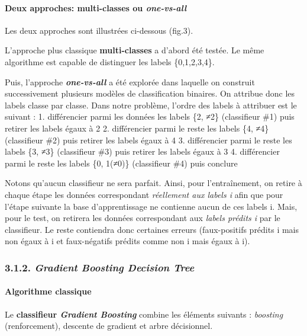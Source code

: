 \documentclass[11pt]{article}
\begin{document}
\paragraph{\texorpdfstring{Deux approches: multi-classes ou
\emph{one-vs-all}}{Deux approches: multi-classes ou one-vs-all}}\label{deux-approches-multi-classes-ou-one-vs-all}

Les deux approches sont illustrées ci-dessous (fig.3).

L'approche plus classique \textbf{multi-classes} a d'abord été testée.
Le même algorithme est capable de distinguer les labels \{0,1,2,3,4\}.

Puis, l'approche \textbf{\emph{one-vs-all}} a été explorée dans laquelle
on construit successivement plusieurs modèles de classification
binaires. On attribue donc les labels classe par classe. Dans notre
problème, l'ordre des labels à attribuer est le suivant : 1.
différencier parmi les données les labels \{2, ≠2\} (classifieur \#1)
puis retirer les labels égaux à 2 2. différencier parmi le reste les
labels \{4, ≠4\} (classifieur \#2) puis retirer les labels égaux à 4 3.
différencier parmi le reste les labels \{3, ≠3\} (classifieur \#3) puis
retirer les labels égaux à 3 4. différencier parmi le reste les labels
\{0, 1(≠0)\} (classifieur \#4) puis conclure

Notons qu'aucun classifieur ne sera parfait. Ainsi, pour l'entraînement,
on retire à chaque étape les données correspondant \emph{réellement aux
labels i} afin que pour l'étape suivante la base d'apprentissage ne
contienne aucun de ces labels i. Mais, pour le test, on retirera les
données correspondant aux \emph{labels prédits i} par le classifieur. Le
reste contiendra donc certaines erreurs (faux-positifs prédits i mais
non égaux à i et faux-négatifs prédits comme non i mais égaux à i).

    \subsubsection{\texorpdfstring{3.1.2. \emph{Gradient Boosting Decision
Tree}}{3.1.2. Gradient Boosting Decision Tree}}\label{gradient-boosting-decision-tree}

\paragraph{Algorithme classique}\label{algorithme-classique}

Le \textbf{classifieur \emph{Gradient Boosting}} combine les éléments
suivants : \emph{boosting} (renforcement), descente de gradient et arbre
décisionnel.
\end{document}
